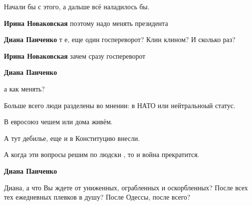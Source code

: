 \begin{itemize}
Начали бы с этого, а дальше всё наладилось бы.

\begin{itemize}

 
\textbf{Ирина Новаковская} поэтому надо менять президента

 
\textbf{Диана Панченко} т е, еще один госпереворот?
Клин клином?
И сколько раз?


 
\textbf{Ирина Новаковская} зачем сразу госпереворот

 
\textbf{Диана Панченко} 

а как менять?

Больше всего люди разделены во мнении: в НАТО или нейтральноый статус.

В евросоюз чешем или дома живём.

А тут дебилье, еще и в Конституцию внесли.

А когда эти вопросы решим по людски , то и война прекратится.


 
\textbf{Диана Панченко} 

Диана, а что Вы ждете от униженных, ограбленных и оскорбленных? После всех тех
ежедневных плевков в душу? После Одессы, после всего?


\end{itemize}
\end{itemize}
